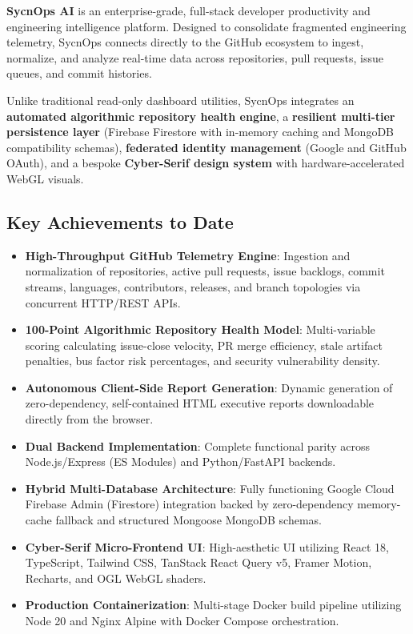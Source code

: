\documentclass[11pt,a4paper]{article}
\begin{document}
\textbf{SycnOps AI} is an enterprise-grade, full-stack developer productivity and engineering intelligence platform. Designed to consolidate fragmented engineering telemetry, SycnOps connects directly to the GitHub ecosystem to ingest, normalize, and analyze real-time data across repositories, pull requests, issue queues, and commit histories.

Unlike traditional read-only dashboard utilities, SycnOps integrates an \textbf{automated algorithmic repository health engine}, a \textbf{resilient multi-tier persistence layer} (Firebase Firestore with in-memory caching and MongoDB compatibility schemas), \textbf{federated identity management} (Google and GitHub OAuth), and a bespoke \textbf{Cyber-Serif design system} with hardware-accelerated WebGL visuals.

\subsection{Key Achievements to Date}
\begin{itemize}[leftmargin=1.5em]
    \item \textbf{High-Throughput GitHub Telemetry Engine}: Ingestion and normalization of repositories, active pull requests, issue backlogs, commit streams, languages, contributors, releases, and branch topologies via concurrent HTTP/REST APIs.
    \item \textbf{100-Point Algorithmic Repository Health Model}: Multi-variable scoring calculating issue-close velocity, PR merge efficiency, stale artifact penalties, bus factor risk percentages, and security vulnerability density.
    \item \textbf{Autonomous Client-Side Report Generation}: Dynamic generation of zero-dependency, self-contained HTML executive reports downloadable directly from the browser.
    \item \textbf{Dual Backend Implementation}: Complete functional parity across Node.js/Express (ES Modules) and Python/FastAPI backends.
    \item \textbf{Hybrid Multi-Database Architecture}: Fully functioning Google Cloud Firebase Admin (Firestore) integration backed by zero-dependency memory-cache fallback and structured Mongoose MongoDB schemas.
    \item \textbf{Cyber-Serif Micro-Frontend UI}: High-aesthetic UI utilizing React 18, TypeScript, Tailwind CSS, TanStack React Query v5, Framer Motion, Recharts, and OGL WebGL shaders.
    \item \textbf{Production Containerization}: Multi-stage Docker build pipeline utilizing Node 20 and Nginx Alpine with Docker Compose orchestration.
\end{itemize}
\end{document}
